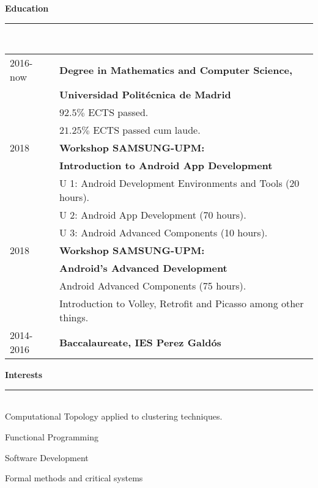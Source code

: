 \documentclass{article}
\begin{document}
\begin{minipage}[c]{0.66\linewidth}
  \textbf{\Large{\color{BlueViolet}Education}}\\[-0.25cm]
  {\color{BlueViolet} \rule{\linewidth}{0.1mm} }\\[-0.25cm]
  \begin{tabular}{l l}
    2016-now& \textbf{Degree in Mathematics and Computer Science,} \\  & \textbf{Universidad Politécnica de Madrid}\\
         & \normalsize \quad $92.5\%$ ECTS passed.\\
         & \normalsize \quad $21.25\%$ ECTS passed cum laude.\\[0.3cm]
    2018 & \textbf{Workshop SAMSUNG-UPM:} \\ & \textbf{Introduction to Android App Development} \\
         & \normalsize \quad U 1: Android Development Environments and Tools (20 hours). \\
         & \normalsize \quad U 2: Android App Development (70 hours). \\
         & \normalsize \quad U 3: Android Advanced Components (10 hours). \\[0.3cm]
    2018 & \textbf{Workshop SAMSUNG-UPM:} \\ & \textbf{Android's Advanced Development} \\
         & \normalsize \quad Android Advanced Components (75 hours). \\
         & \normalsize \quad Introduction to Volley, Retrofit and Picasso among other things. \\[0.3cm]
    2014-2016& \textbf{Baccalaureate, IES Perez Galdós}\\[0.3cm]
    
  \end{tabular}
  
  \textbf{\Large{\color{BlueViolet}Interests}}\\[-0.25cm]
  {\color{BlueViolet} \rule{\linewidth}{0.1mm} }\\[-0.25cm]
  Computational Topology applied to clustering techniques.

  Functional Programming

  Software Development

  Formal methods and critical systems
  
\end{minipage}
\end{document}
